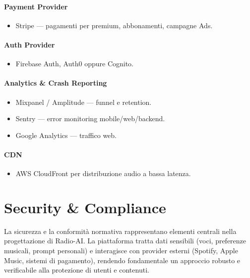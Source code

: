 \documentclass[11pt,a4paper]{article}
\begin{document}
\paragraph{Payment Provider}
\begin{itemize}
    \item Stripe — pagamenti per premium, abbonamenti, campagne Ads.
\end{itemize}

\paragraph{Auth Provider}
\begin{itemize}
    \item Firebase Auth, Auth0 oppure Cognito.
\end{itemize}

\paragraph{Analytics \& Crash Reporting}
\begin{itemize}
    \item Mixpanel / Amplitude — funnel e retention.
    \item Sentry — error monitoring mobile/web/backend.
    \item Google Analytics — traffico web.
\end{itemize}

\paragraph{CDN}
\begin{itemize}
    \item AWS CloudFront per distribuzione audio a bassa latenza.
\end{itemize}
\section{Security \& Compliance}

La sicurezza e la conformità normativa rappresentano elementi centrali nella progettazione di Radio-AI.  
La piattaforma tratta dati sensibili (voci, preferenze musicali, prompt personali) e interagisce con provider esterni (Spotify, Apple Music, sistemi di pagamento), rendendo fondamentale un approccio robusto e verificabile alla protezione di utenti e contenuti.

\end{document}
